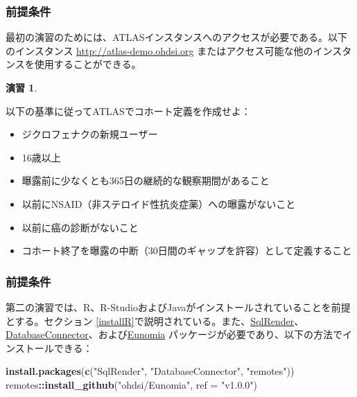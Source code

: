 \documentclass[
  11pt]{book}
\newenvironment{Shaded}{\begin{snugshade}}{\end{snugshade}}
\newcommand{\AttributeTok}[1]{\textcolor[rgb]{0.13,0.29,0.53}{#1}}
\newcommand{\FunctionTok}[1]{\textcolor[rgb]{0.13,0.29,0.53}{\textbf{#1}}}
\newcommand{\NormalTok}[1]{#1}
\newcommand{\SpecialCharTok}[1]{\textcolor[rgb]{0.81,0.36,0.00}{\textbf{#1}}}
\newcommand{\StringTok}[1]{\textcolor[rgb]{0.31,0.60,0.02}{#1}}
\providecommand{\tightlist}{%
  \setlength{\itemsep}{0pt}\setlength{\parskip}{0pt}}
\theoremstyle{definition}
\theoremstyle{definition}
\theoremstyle{definition}
\newtheorem{exercise}{演習}[chapter]
\theoremstyle{definition}
\theoremstyle{remark}
\begin{document}
\subsubsection*{前提条件}\label{ux524dux63d0ux6761ux4ef6-4}

最初の演習のためには、ATLASインスタンスへのアクセスが必要である。以下のインスタンス \url{http://atlas-demo.ohdsi.org} またはアクセス可能な他のインスタンスを使用することができる。

\begin{exercise}
\protect\hypertarget{exr:exerciseCohortsAtlas}{}\label{exr:exerciseCohortsAtlas}

以下の基準に従ってATLASでコホート定義を作成せよ：

\begin{itemize}
\tightlist
\item
  ジクロフェナクの新規ユーザー
\item
  16歳以上
\item
  曝露前に少なくとも365日の継続的な観察期間があること
\item
  以前にNSAID（非ステロイド性抗炎症薬）への曝露がないこと
\item
  以前に癌の診断がないこと
\item
  コホート終了を曝露の中断（30日間のギャップを許容）として定義すること
\end{itemize}

\end{exercise}

\subsubsection*{前提条件}\label{ux524dux63d0ux6761ux4ef6-5}

第二の演習では、R、R-StudioおよびJavaがインストールされていることを前提とする。セクション \ref{installR}で説明されている。また、\href{https://ohdsi.github.io/SqlRender/}{SqlRender}、\href{https://ohdsi.github.io/DatabaseConnector/}{DatabaseConnector}、および\href{https://ohdsi.github.io/Eunomia/}{Eunomia} パッケージが必要であり、以下の方法でインストールできる：

\begin{Shaded}
\begin{Highlighting}[]
\FunctionTok{install.packages}\NormalTok{(}\FunctionTok{c}\NormalTok{(}\StringTok{"SqlRender"}\NormalTok{, }\StringTok{"DatabaseConnector"}\NormalTok{, }\StringTok{"remotes"}\NormalTok{))}
\NormalTok{remotes}\SpecialCharTok{::}\FunctionTok{install\_github}\NormalTok{(}\StringTok{"ohdsi/Eunomia"}\NormalTok{, }\AttributeTok{ref =} \StringTok{"v1.0.0"}\NormalTok{)}
\end{Highlighting}
\end{Shaded}
\end{document}
